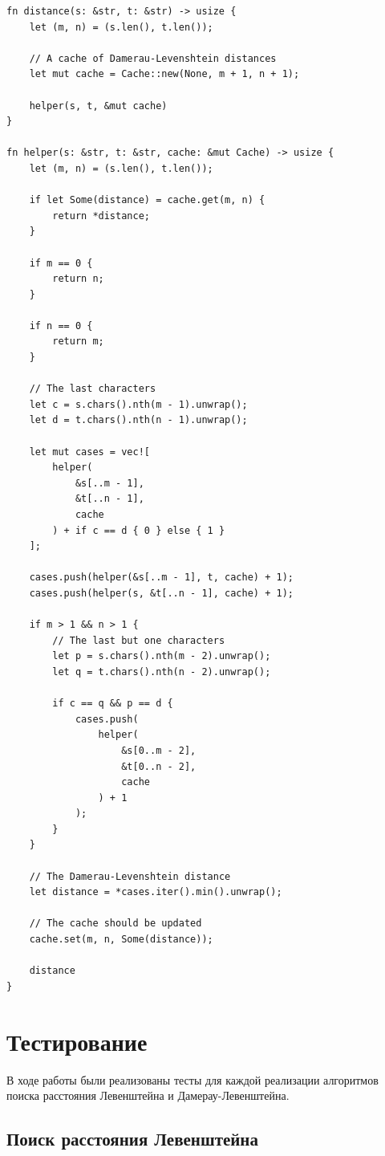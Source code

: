 \documentclass{report}
\begin{document}
\begin{lstlisting}[caption=Реализация рекурсивного алгоритма с
    кэшем поиска $\Delta_{\textup{ДЛ}}$]
fn distance(s: &str, t: &str) -> usize {
    let (m, n) = (s.len(), t.len());

    // A cache of Damerau-Levenshtein distances
    let mut cache = Cache::new(None, m + 1, n + 1);

    helper(s, t, &mut cache)
}

fn helper(s: &str, t: &str, cache: &mut Cache) -> usize {
    let (m, n) = (s.len(), t.len());

    if let Some(distance) = cache.get(m, n) {
        return *distance;
    }

    if m == 0 {
        return n;
    }

    if n == 0 {
        return m;
    }

    // The last characters
    let c = s.chars().nth(m - 1).unwrap();
    let d = t.chars().nth(n - 1).unwrap();

    let mut cases = vec![
        helper(
            &s[..m - 1],
            &t[..n - 1],
            cache
        ) + if c == d { 0 } else { 1 }
    ];

    cases.push(helper(&s[..m - 1], t, cache) + 1);
    cases.push(helper(s, &t[..n - 1], cache) + 1);

    if m > 1 && n > 1 {
        // The last but one characters
        let p = s.chars().nth(m - 2).unwrap();
        let q = t.chars().nth(n - 2).unwrap();

        if c == q && p == d {
            cases.push(
                helper(
                    &s[0..m - 2],
                    &t[0..n - 2],
                    cache
                ) + 1
            );
        }
    }

    // The Damerau-Levenshtein distance
    let distance = *cases.iter().min().unwrap();

    // The cache should be updated
    cache.set(m, n, Some(distance));

    distance
}
\end{lstlisting}

\section{Тестирование}

В ходе работы были реализованы тесты для каждой реализации
алгоритмов поиска расстояния Левенштейна и Дамерау-Левенштейна.

\subsection{Поиск расстояния Левенштейна} \label{test-vl}
\end{document}
